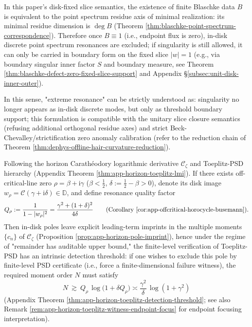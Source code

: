 \begin{remark}\label{rem:xi-threshold-carrying-extreme-resonance}
In this paper's disk-fixed slice semantics, the existence of finite Blaschke data \(B\) is equivalent to the point spectrum residue axis of minimal realization: its minimal residue dimension is \(\deg B\) (Theorem \ref{thm:blaschke-point-spectrum-correspondence}).
Therefore once \(B\equiv 1\) (i.e., endpoint flux is zero), in-disk discrete point spectrum resonances are excluded;
if singularity is still allowed, it can only be carried in boundary form on the fixed slice \(|w|=1\) (e.g., via boundary singular inner factor \(S\) and boundary measure, see Theorem \ref{thm:blaschke-defect-zero-fixed-slice-support} and Appendix \S\ref{subsec:unit-disk-inner-outer}).
\par
In this sense, "extreme resonance" can be strictly understood as: singularity no longer appears as in-disk discrete modes, but only as threshold boundary support;
this formulation is compatible with the unitary slice closure semantics (refusing additional orthogonal residue axes) and strict Beck-Chevalley/strictification zero anomaly calibration (refer to the reduction chain of Theorem \ref{thm:dephys-offline-hair-curvature-reduction}).
\end{remark}

\begin{proposition}\label{prop:xi-extreme-resonance-toeplitz-threshold}
Following the horizon Carathéodory logarithmic derivative \(\mathscr{C}_{\zeta}\) and Toeplitz-PSD hierarchy (Appendix Theorem \ref{thm:app-horizon-toeplitz-lmi}).
If there exists off-critical-line zero \(\rho=\beta+\mathrm{i}\gamma\) (\(\beta<\tfrac12\), \(\delta:=\tfrac12-\beta>0\)), denote its disk image \(w_\rho=\mathcal{C}(\gamma+\mathrm{i}\delta)\in\mathbb{D}\), and define resonance quality factor
\[
Q_\rho:=\frac{1}{1-|w_\rho|^2}=\frac{\gamma^2+(1+\delta)^2}{4\delta}
\qquad\text{(Corollary \ref{cor:app-offcritical-horocycle-busemann})}.
\]
Then in-disk poles leave explicit leading-term imprints in the multiple moments \(\{c_n\}\) of \(\mathscr{C}_{\zeta}\) (Proposition \ref{prop:app-horizon-pole-imprint}), hence under the regime of "remainder has auditable upper bound," the finite-level verification of Toeplitz-PSD has an intrinsic detection threshold: if one wishes to exclude this pole by finite-level PSD certificate (i.e., force a finite-dimensional failure witness), the required moment order \(N\) must satisfy
\[
N\ \gtrsim\ Q_\rho\,\log\!\bigl(1+\delta Q_\rho\bigr)
\asymp \frac{\gamma^2}{\delta}\,\log(1+\gamma^2)
\]
(Appendix Theorem \ref{thm:app-horizon-toeplitz-detection-threshold}; see also Remark \ref{rem:app-horizon-toeplitz-witness-endpoint-focus} for endpoint focusing interpretation).
\end{proposition}


